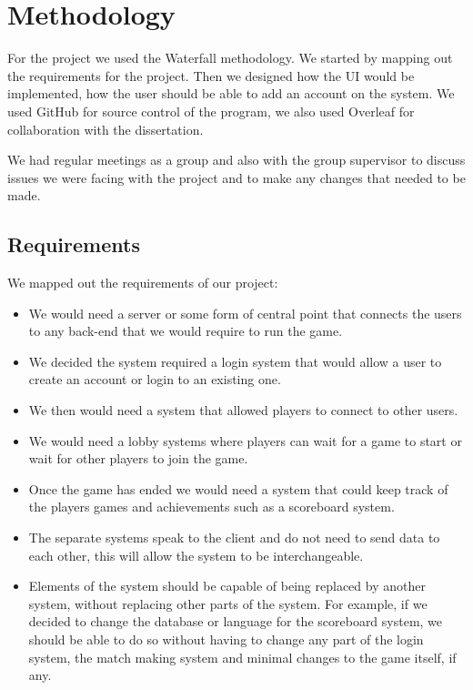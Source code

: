 
\chapter{Methodology}

For the project we used the Waterfall methodology. We started by mapping out the requirements for the project. Then we designed how the UI would be implemented, how the user should be able to add an account on the system. We used GitHub for source control of the program, we also used Overleaf for collaboration with the dissertation.
\newline

We had regular meetings as a group and also with the group supervisor to discuss issues we were facing with the project and to make any changes that needed to be made.

\section{Requirements}

We mapped out the requirements of our project:
\begin{itemize}
\item We would need a server or some form of central point that connects the users to any back-end that we would require to run the game.
\item We decided the system required a login system that would allow a user to create an account or login to an existing one.
\item We then would need a system that allowed players to connect to other users.
\item We would need a lobby systems where players can wait for a game to start or wait for other players to join the game.
\item Once the game has ended we would need a system that could keep track of the players games and achievements such as a scoreboard system.
\item The separate systems speak to the client and do not need to send data to each other, this will allow the system to be interchangeable.
\item Elements of the system should be capable of being replaced by another system, without replacing other parts of the system. For example, if we decided to change the database or language for the scoreboard system, we should be able to do so without having to change any part of the login system, the match making system and minimal changes to the game itself, if any.
\end{itemize}


